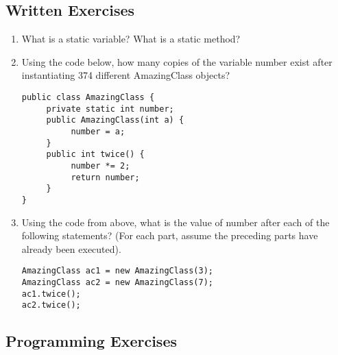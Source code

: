 
\subsection{Written Exercises}

\setcounter{counter}{1}
\begin{enumerate}[label={\arabic{counter}\addtocounter{counter}{1}}.]

\item What is a static variable? What is a static method?

\item Using the code below, how many copies of the variable number exist after instantiating 374 different AmazingClass objects?
\begin{lstlisting}
public class AmazingClass {
     private static int number;
     public AmazingClass(int a) {
          number = a;
     }
     public int twice() {
          number *= 2;
          return number;
     }
}
\end{lstlisting}

\item Using the code from above, what is the value of number after each of the following statements? (For each part, assume the preceding parts have already been executed).
\begin{lstlisting}
AmazingClass ac1 = new AmazingClass(3);
AmazingClass ac2 = new AmazingClass(7);
ac1.twice();
ac2.twice();
\end{lstlisting}

\end{enumerate}

\subsection{Programming Exercises}